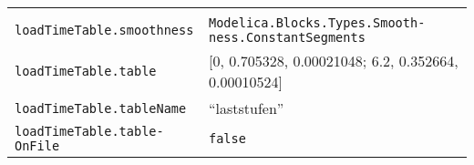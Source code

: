 \begin{longtable}[]{@{}ll@{}}
\begin{minipage}[t]{0.63\columnwidth}
\end{minipage}\tabularnewline
\begin{minipage}[t]{0.31\columnwidth}\raggedright
\texttt{loadTimeTable.smooth­ness}\strut
\end{minipage} & \begin{minipage}[t]{0.63\columnwidth}\raggedright
\texttt{Modelica.­Blocks.­Types.­Smooth­ness.­ConstantSegments}\strut
\end{minipage}\tabularnewline
\begin{minipage}[t]{0.31\columnwidth}\raggedright
\texttt{loadTimeTable.table}\strut
\end{minipage} & \begin{minipage}[t]{0.63\columnwidth}\raggedright
{[}0, 0.705328, 0.00021048; 6.2, 0.352664, 0.00010524{]}\strut
\end{minipage}\tabularnewline
\begin{minipage}[t]{0.31\columnwidth}\raggedright
\texttt{loadTimeTable.tableName}\strut
\end{minipage} & \begin{minipage}[t]{0.63\columnwidth}\raggedright
``laststufen''\strut
\end{minipage}\tabularnewline
\begin{minipage}[t]{0.31\columnwidth}\raggedright
\texttt{loadTimeTable.table­OnFile}\strut
\end{minipage} & \begin{minipage}[t]{0.63\columnwidth}\raggedright
\texttt{false}\strut
\end{minipage}\tabularnewline
\bottomrule
\end{longtable}
